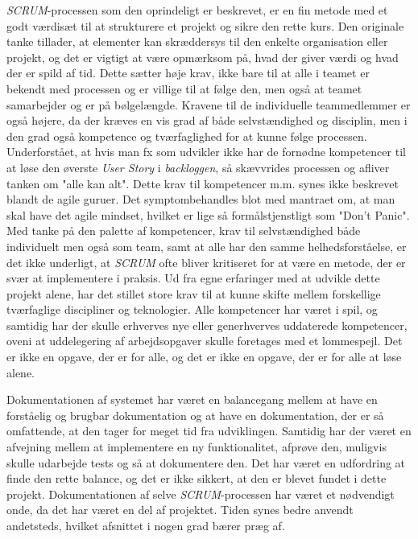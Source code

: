 \emph{SCRUM}-processen som den oprindeligt er beskrevet, er en fin metode med et godt værdisæt til at strukturere et projekt og sikre den rette kurs.
Den originale tanke tillader, at elementer kan skræddersys til den enkelte organisation eller projekt, og det er vigtigt at være opmærksom på, hvad der giver værdi og hvad der er spild af tid.
Dette sætter høje krav, ikke bare til at alle i teamet er bekendt med processen og er villige til at følge den, men også at teamet samarbejder og er på bølgelængde.
Kravene til de individuelle teammedlemmer er også højere, da der kræves en vis grad af både selvstændighed og disciplin, men i den grad også kompetence og tværfaglighed for at kunne følge processen.
Underforstået, at hvis man fx som udvikler ikke har de fornødne kompetencer til at løse den øverste \emph{User Story} i \emph{backloggen}, så skævvrides processen og afliver tanken om "alle kan alt". 
Dette krav til kompetencer m.m. synes ikke beskrevet blandt de agile guruer. Det symptombehandles blot med mantraet om, at man skal have det agile mindset, hvilket er lige så formålstjenstligt som "Don't Panic".
Med tanke på den palette af kompetencer, krav til selvstændighed både individuelt men også som team, samt at alle har den samme helhedsforståelse, er det ikke underligt, at \emph{SCRUM} ofte bliver kritiseret for at være en metode, der er svær at implementere i praksis.
Ud fra egne erfaringer med at udvikle dette projekt alene, har det stillet store krav til at kunne skifte mellem forskellige tværfaglige discipliner og teknologier. 
Alle kompetencer har været i spil, og samtidig har der skulle erhverves nye eller generhverves uddaterede kompetencer, oveni at uddelegering af arbejdsopgaver skulle foretages med et lommespejl.
Det er ikke en opgave, der er for alle, og det er ikke en opgave, der er for alle at løse alene.

Dokumentationen af systemet har været en balancegang mellem at have en forståelig og brugbar dokumentation og at have en dokumentation, der er så omfattende, at den tager for meget tid fra udviklingen.
Samtidig har der været en afvejning mellem at implementere en ny funktionalitet, afprøve den, muligvis skulle udarbejde tests og så at dokumentere den.
Det har været en udfordring at finde den rette balance, og det er ikke sikkert, at den er blevet fundet i dette projekt. 
Dokumentationen af selve \emph{SCRUM}-processen har været et nødvendigt onde, da det har været en del af projektet. Tiden synes bedre anvendt andetsteds, hvilket afsnittet i nogen grad bærer præg af.

